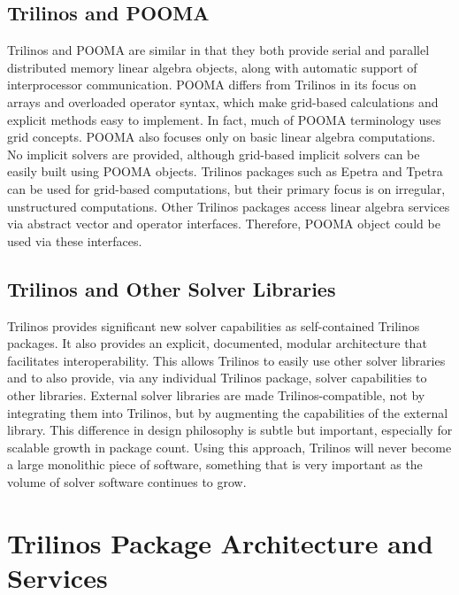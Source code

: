 \documentclass[12pt,relax]{TPA}
\begin{document}
\subsection{Trilinos and POOMA}

Trilinos and POOMA are similar in that they both provide serial and parallel
distributed memory linear algebra objects, along with automatic support of
interprocessor communication.   POOMA differs from Trilinos in its
focus on arrays and overloaded operator syntax, which make
grid-based calculations and explicit methods easy to implement.  In
fact, much of POOMA terminology uses grid concepts.  POOMA also focuses
only on basic linear algebra computations.  No implicit solvers are
provided, although grid-based implicit solvers can be easily built
using POOMA objects.
Trilinos packages such as Epetra and Tpetra can be used for grid-based
computations, but their primary focus is on
irregular, unstructured computations.  Other Trilinos packages access
linear algebra services via abstract vector and operator interfaces.
Therefore, POOMA object could be used via these interfaces. 

\subsection{Trilinos and Other Solver Libraries}
Trilinos provides significant new solver capabilities as 
self-contained Trilinos packages.  It also provides an explicit,
documented, modular architecture that 
facilitates interoperability.  This allows Trilinos to easily use
other solver libraries and to also provide, via any individual Trilinos
package, solver capabilities to other libraries. External solver
libraries are made Trilinos-compatible, not by integrating them into
Trilinos, but by augmenting the capabilities of the external library.
This difference in design philosophy is subtle but important,
especially for scalable growth in package count.  Using this approach,
Trilinos will never become a large monolithic piece of software,
something that is very important as the volume of solver software
continues to grow.

\section{Trilinos Package Architecture and Services}
\label{sect:TrilinosServices}
\end{document}
